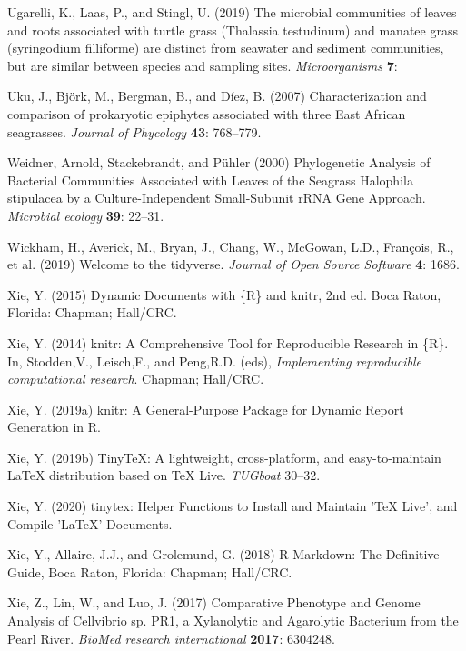 \documentclass[12pt,]{article}
\begin{document}
\leavevmode\hypertarget{ref-Ugarelli2019}{}%
Ugarelli, K., Laas, P., and Stingl, U. (2019) The microbial communities
of leaves and roots associated with turtle grass (Thalassia testudinum)
and manatee grass (syringodium filliforme) are distinct from seawater
and sediment communities, but are similar between species and sampling
sites. \emph{Microorganisms} \textbf{7}:

\leavevmode\hypertarget{ref-Uku2007}{}%
Uku, J., Björk, M., Bergman, B., and Díez, B. (2007) Characterization
and comparison of prokaryotic epiphytes associated with three East
African seagrasses. \emph{Journal of Phycology} \textbf{43}: 768--779.

\leavevmode\hypertarget{ref-Weidner2000}{}%
Weidner, Arnold, Stackebrandt, and Pühler (2000) Phylogenetic Analysis
of Bacterial Communities Associated with Leaves of the Seagrass
Halophila stipulacea by a Culture-Independent Small-Subunit rRNA Gene
Approach. \emph{Microbial ecology} \textbf{39}: 22--31.

\leavevmode\hypertarget{ref-Wickham2019}{}%
Wickham, H., Averick, M., Bryan, J., Chang, W., McGowan, L.D., François,
R., et al. (2019) Welcome to the tidyverse. \emph{Journal of Open Source
Software} \textbf{4}: 1686.

\leavevmode\hypertarget{ref-Xie2015}{}%
Xie, Y. (2015) Dynamic Documents with \{R\} and knitr, 2nd ed. Boca
Raton, Florida: Chapman; Hall/CRC.

\leavevmode\hypertarget{ref-Xie2014}{}%
Xie, Y. (2014) knitr: A Comprehensive Tool for Reproducible Research in
\{R\}. In, Stodden,V., Leisch,F., and Peng,R.D. (eds),
\emph{Implementing reproducible computational research}. Chapman;
Hall/CRC.

\leavevmode\hypertarget{ref-Xie2019a}{}%
Xie, Y. (2019a) knitr: A General-Purpose Package for Dynamic Report
Generation in R.

\leavevmode\hypertarget{ref-Xie2019}{}%
Xie, Y. (2019b) TinyTeX: A lightweight, cross-platform, and
easy-to-maintain LaTeX distribution based on TeX Live. \emph{TUGboat}
30--32.

\leavevmode\hypertarget{ref-Xie2020}{}%
Xie, Y. (2020) tinytex: Helper Functions to Install and Maintain 'TeX
Live', and Compile 'LaTeX' Documents.

\leavevmode\hypertarget{ref-Xie2018}{}%
Xie, Y., Allaire, J.J., and Grolemund, G. (2018) R Markdown: The
Definitive Guide, Boca Raton, Florida: Chapman; Hall/CRC.

\leavevmode\hypertarget{ref-Xie2017}{}%
Xie, Z., Lin, W., and Luo, J. (2017) Comparative Phenotype and Genome
Analysis of Cellvibrio sp. PR1, a Xylanolytic and Agarolytic Bacterium
from the Pearl River. \emph{BioMed research international}
\textbf{2017}: 6304248.
\end{document}
